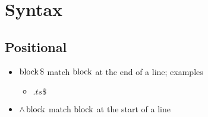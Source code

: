\chapter{Syntax}

\section{Positional}

  \begin{itemize}
    \item $ \block \$ $ match $ \operatorname{block} $ at the end of a line; examples
    \begin{itemize}
      \item $ .ts \$ $
    \end{itemize}

    \item $ \wedge \operatorname{block} $ match $ \operatorname{block} $ at the start of a line
  \end{itemize}
